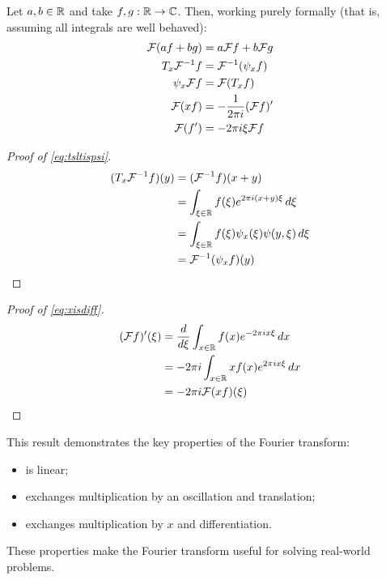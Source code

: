       \begin{lemma}
        \label{lemma:fourprops}
        Let $a,b\in\mathbb{R}$ and take $f,g:\mathbb{R}\rightarrow\mathbb{C}$.
        Then, working purely formally (that is, assuming all integrals are well behaved):
        \begin{align}
          \mathcal{F}(af + bg) &= a\mathcal{F} f + b\mathcal{F} g\\
          \label{eq:tsltispsi}
            T_x\mathcal{F}^{-1}f &= \mathcal{F}^{-1}(\psi_xf)\\
          \label{eq:tsltispsi2}
          \psi_x\mathcal{F} f &= \mathcal{F}(T_xf)\\
          \label{eq:xisdiff}
            \mathcal{F}(xf) &= -\frac{1}{2\pi i}(\mathcal{F} f)'\\
          \label{eq:xisdiff2}
            \mathcal{F}(f') &= -2\pi i\xi\mathcal{F} f
        \end{align}
        \begin{proof}[Proof of \cref{eq:tsltispsi}]
          \begin{align*}
            (T_x\mathcal{F}^{-1}f)(y) &= (\mathcal{F}^{-1}f)(x+y)\\
            &= \int_{\xi\in\mathbb{R}}f(\xi)e^{2\pi i(x+y)\xi}\,d\xi\\
            &= \int_{\xi\in\mathbb{R}}f(\xi)\psi_x(\xi)\psi(y,\xi)\,d\xi\\
            &= \mathcal{F}^{-1}(\psi_xf)(y)
          \end{align*}
        \end{proof}
        \begin{proof}[Proof of \cref{eq:xisdiff}]
          \begin{align*}
            (\mathcal{F} f)'(\xi) &= \frac{d}{d\xi}\int_{x\in\mathbb{R}} f(x)e^{-2\pi i x\xi}\,dx\\
            &= -2\pi i \int_{x\in\mathbb{R}} xf(x)e^{2\pi i x\xi}\,dx\\
            &= -2\pi i\mathcal{F}(xf)(\xi)
          \end{align*}
        \end{proof}
      \end{lemma}
      This result demonstrates the key properties of the Fourier transform:
      \begin{itemize}
        \item \F is linear;
        \item \F exchanges multiplication by an oscillation and translation;
        \item \F exchanges multiplication by $x$ and differentiation.
      \end{itemize}
      These properties make the Fourier transform useful for solving real-world problems.
